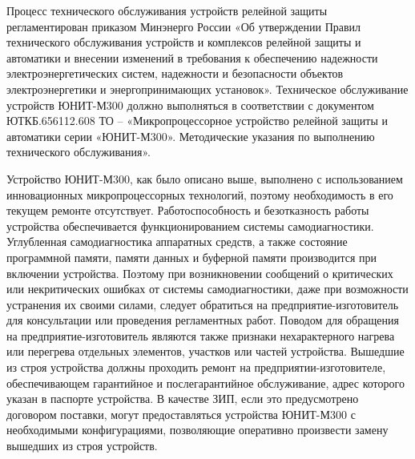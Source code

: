 \color{black}

\color{black}
\nopagebreak
\vspace{3mm}
\par
\sloppy

\par
Процесс  технического  обслуживания  устройств  релейной  защиты  регламентирован  приказом Минэнерго  России  «Об  утверждении  Правил  технического  обслуживания  устройств  и  комплексов релейной  защиты  и  автоматики  и  внесении  изменений  в  требования  к  обеспечению  надежности электроэнергетических  систем,  надежности  и  безопасности  объектов  электроэнергетики  и 
энергопринимающих установок». 
Техническое обслуживание устройств ЮНИТ-М300 должно выполняться в соответствии с документом \color{red}ЮТКБ.656112.608  ТО  –  «Микропроцессорное  устройство  релейной  защиты  и  автоматики  серии «ЮНИТ-М300»\color{black}. Методические указания по выполнению технического обслуживания». 

{
\color{black}
\nopagebreak
\vspace{3mm}
}

Устройство  ЮНИТ-М300,  как  было  описано  выше,  выполнено  с  использованием  инновационных микропроцессорных  технологий,  поэтому  необходимость  в  его  текущем  ремонте  отсутствует. 
Работоспособность  и  безотказность  работы  устройства  обеспечивается  функционированием  системы самодиагностики. 
Углубленная самодиагностика аппаратных средств, а также состояние программной памяти, памяти данных  и  буферной  памяти  производится  при  включении  устройства.  Поэтому  при  возникновении 
сообщений о критических или некритических ошибках от системы самодиагностики, даже при возможности устранения  их  своими  силами,  следует  обратиться  на  предприятие-изготовитель для  консультации или проведения регламентных работ. 
Поводом  для  обращения  на  предприятие-изготовитель  являются  также  признаки  нехарактерного нагрева или перегрева отдельных элементов, участков или частей устройства. 
Вышедшие  из  строя  устройства  должны  проходить  ремонт  на  предприятии-изготовителе, обеспечивающем  гарантийное  и  послегарантийное  обслуживание,  адрес  которого  указан  в  паспорте 
устройства.  В  качестве  ЗИП,  если  это  предусмотрено  договором  поставки,  могут  предоставляться устройства  ЮНИТ-М300  с  необходимыми  конфигурациями,  позволяющие  оперативно  произвести  замену вышедших из строя устройств.

